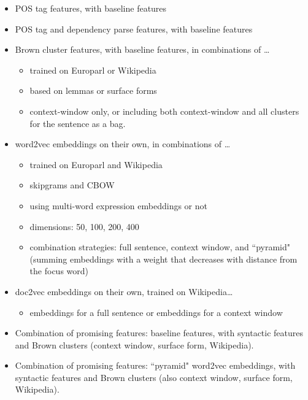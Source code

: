 \begin{itemize}
  \item POS tag features, with baseline features
  \item POS tag and dependency parse features, with baseline features

  \item Brown cluster features, with baseline features, in combinations of
  \dots{}
    \begin{itemize}
      \item trained on Europarl or Wikipedia
      \item based on lemmas or surface forms
      \item context-window only, or including both context-window and all
      clusters for the sentence as a bag.
    \end{itemize}

  \item word2vec embeddings on their own, in combinations of \dots{}
    \begin{itemize}
      \item trained on Europarl and Wikipedia
      \item skipgrams and CBOW
      \item using multi-word expression embeddings or not
      \item dimensions: 50, 100, 200, 400
      \item combination strategies: full sentence, context window, and
      ``pyramid" (summing embeddings with a weight that decreases with distance
      from the focus word)
    \end{itemize}

  \item doc2vec embeddings on their own, trained on Wikipedia\dots{}
    \begin{itemize}
      \item embeddings for a full sentence or embeddings for a context window
    \end{itemize}

  \item Combination of promising features: baseline features, with syntactic
  features and Brown clusters (context window, surface form, Wikipedia).
  \item Combination of promising features: ``pyramid" word2vec embeddings, with
  syntactic features and Brown clusters (also context window, surface form,
  Wikipedia).
\end{itemize}

